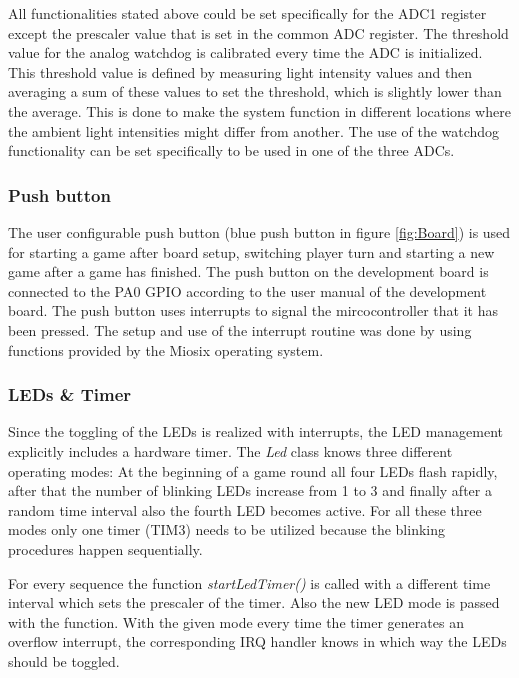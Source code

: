 All functionalities stated above could be set specifically for the ADC1 register except the prescaler value that is set in the common ADC register. The threshold value for the analog watchdog is calibrated every time the ADC is initialized. This threshold value is defined by measuring light intensity values and then averaging a sum of these values to set the threshold, which is slightly lower than the average. This is done to make the system function in different locations where the ambient light intensities might differ from another. The use of the watchdog functionality can be set specifically to be used in one of the three ADCs.

\subsubsection{Push button}
The user configurable push button (blue push button in figure \ref{fig:Board}) is used for starting a game after board setup, switching player turn and starting a new game after a game has finished. The push button on the development board is connected to the PA0 GPIO according to the user manual \cite{UsrManual} of the development board. The push button uses interrupts to signal the mircocontroller that it has been pressed. The setup and use of the interrupt routine was done by using functions provided by the Miosix operating system.

\subsubsection{LEDs \& Timer}
Since the toggling of the LEDs is realized with interrupts, the LED management explicitly includes a hardware timer. The \emph{Led} class knows three different operating modes: At the beginning of a game round all four LEDs flash rapidly, after that the number of blinking LEDs increase from 1 to 3 and finally after a random time interval also the fourth LED becomes active. For all these three modes only one timer (TIM3) needs to be utilized because the blinking procedures happen sequentially.\\
\par
For every sequence the function \emph{startLedTimer()} is called with a different time interval which sets the prescaler of the timer. Also the new LED mode is passed with the function. With the given mode every time the timer generates an overflow interrupt, the corresponding IRQ handler knows in which way the LEDs should be toggled.

